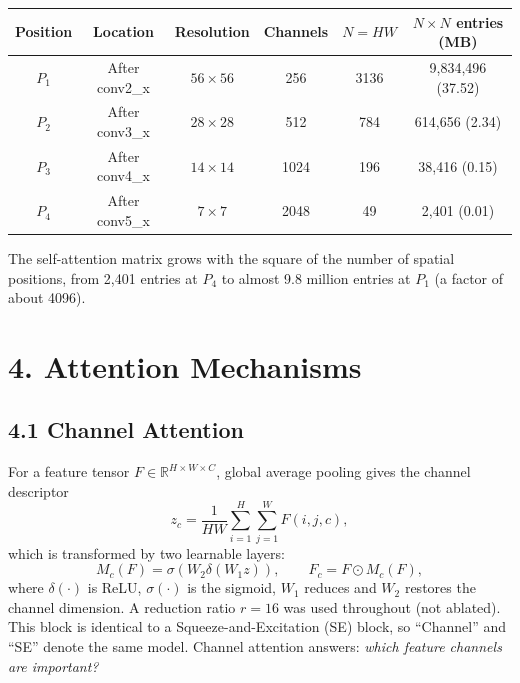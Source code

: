 \documentclass[10pt]{article}
\begin{document}
\begin{center}

\begin{tabular}{|c|c|c|c|c|c|}
\hline

\textbf{Position}
&
\textbf{Location}
&
\textbf{Resolution}
&
\textbf{Channels}
&
\textbf{$N=HW$}
&
\textbf{$N\times N$ entries (MB)}
\\
\hline

$P_1$
&
After conv2\_x
&
$56\times56$
&
256
&
3136
&
9,834,496 (37.52)
\\
\hline

$P_2$
&
After conv3\_x
&
$28\times28$
&
512
&
784
&
614,656 (2.34)
\\
\hline

$P_3$
&
After conv4\_x
&
$14\times14$
&
1024
&
196
&
38,416 (0.15)
\\
\hline

$P_4$
&
After conv5\_x
&
$7\times7$
&
2048
&
49
&
2,401 (0.01)
\\
\hline

\end{tabular}

\end{center}

The self-attention matrix grows with the square of the number of spatial
positions, from 2,401 entries at $P_4$ to almost 9.8 million entries at
$P_1$ (a factor of about 4096).

\section*{4. Attention Mechanisms}

\subsection*{4.1 Channel Attention}

For a feature tensor $F\in\mathbb{R}^{H\times W\times C}$, global average
pooling gives the channel descriptor
\[
z_c
=
\frac{1}{HW}
\sum_{i=1}^{H}
\sum_{j=1}^{W}
F(i,j,c),
\]
which is transformed by two learnable layers:
\[
M_c(F)
=
\sigma
\left(
W_2
\delta
\left(
W_1z
\right)
\right),
\qquad
F_c
=
F\odot M_c(F),
\]
where $\delta(\cdot)$ is ReLU, $\sigma(\cdot)$ is the sigmoid, $W_1$ reduces
and $W_2$ restores the channel dimension. A reduction ratio $r=16$ was used
throughout (not ablated). This block is identical to a Squeeze-and-Excitation
(SE) block, so ``Channel'' and ``SE'' denote the same model. Channel
attention answers: \emph{which feature channels are important?}
\end{document}

